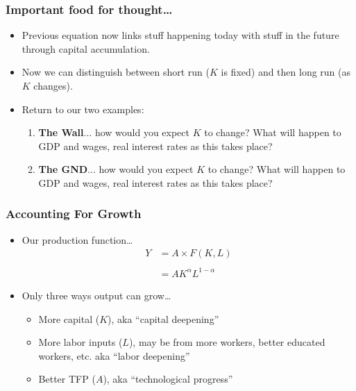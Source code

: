 \documentclass[handout]{beamer}
\begin{document}

\begin{frame}[t]
\frametitle{Important food for thought\ldots}
\footnotesize
\begin{itemize}
\item Previous equation now links stuff happening today with stuff in the future through capital accumulation.
\medskip
\item Now we can distinguish between short run ($K$ is fixed) and then long run (as $K$ changes).
\medskip
\item Return to our two examples:
\begin{enumerate}
\footnotesize
\smallskip
\item \textbf{The Wall}... how would you expect $K$ to change? What will happen to GDP and wages, real interest rates as this takes place?
\medskip
\medskip
\item \textbf{The GND}... how would you expect $K$ to change? What will happen to GDP and wages, real interest rates as this takes place?
\end{enumerate}
\end{itemize}
\end{frame}



\begin{frame}[t]
\frametitle{Accounting For Growth}
\begin{itemize}
\item Our production function\ldots
\begin{eqnarray*}
Y &= A \times F(K,L)\\
\\
 &=  A K^{\alpha}L^{1-\alpha}
\end{eqnarray*}
\item Only three ways output can grow\ldots
\begin{itemize}
\bigskip
\item More capital ($K$), aka ``capital deepening''
\bigskip
\item More labor inputs ($L$), may be from more workers, better educated workers, etc. aka ``labor deepening''
\bigskip
\item Better TFP ($A$), aka ``technological progress''
\end{itemize}
\end{itemize}
\end{frame}
\end{document}
